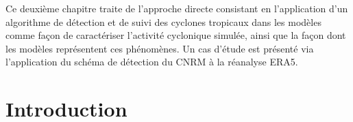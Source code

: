 \documentclass[../main.tex]{subfiles}
\begin{document}
\begin{itshape}
Ce deuxième chapitre traite de l'approche directe consistant en l'application d'un algorithme de détection et de suivi des cyclones tropicaux dans les modèles
comme façon de caractériser l'activité cyclonique simulée, ainsi que la façon dont les modèles représentent ces phénomènes. Un cas d'étude est présenté via
l'application du schéma de détection du CNRM à la réanalyse ERA5.
\end{itshape}

\minitoc\newpage

\section{Introduction}\label{sec:intro_chap2}
\end{document}
